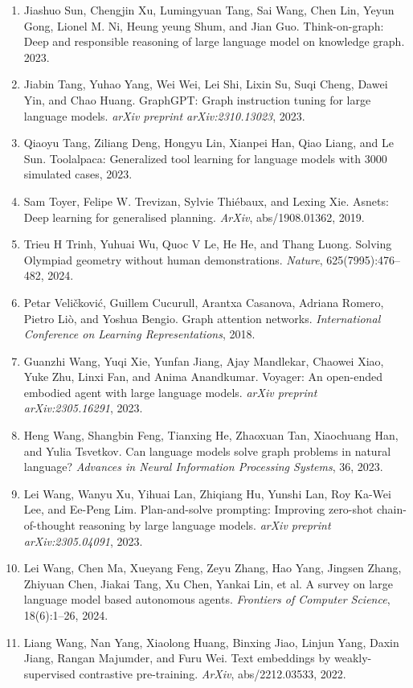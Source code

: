 \documentclass[11pt,UTF8,fontset=fandol]{ctexart}
\begin{document}
\begin{enumerate}[leftmargin=2em]
\item Jiashuo Sun, Chengjin Xu, Lumingyuan Tang, Sai Wang, Chen Lin, Yeyun Gong, Lionel M. Ni, Heung yeung Shum, and Jian Guo. Think-on-graph: Deep and responsible reasoning of large language model on knowledge graph. 2023.
\item Jiabin Tang, Yuhao Yang, Wei Wei, Lei Shi, Lixin Su, Suqi Cheng, Dawei Yin, and Chao Huang. GraphGPT: Graph instruction tuning for large language models. \textit{arXiv preprint arXiv:2310.13023}, 2023.
\item Qiaoyu Tang, Ziliang Deng, Hongyu Lin, Xianpei Han, Qiao Liang, and Le Sun. Toolalpaca: Generalized tool learning for language models with 3000 simulated cases, 2023.
\item Sam Toyer, Felipe W. Trevizan, Sylvie Thi\'ebaux, and Lexing Xie. Asnets: Deep learning for generalised planning. \textit{ArXiv}, abs/1908.01362, 2019.
\item Trieu H Trinh, Yuhuai Wu, Quoc V Le, He He, and Thang Luong. Solving Olympiad geometry without human demonstrations. \textit{Nature}, 625(7995):476--482, 2024.
\item Petar Veli\v{c}kovi\'c, Guillem Cucurull, Arantxa Casanova, Adriana Romero, Pietro Li\`o, and Yoshua Bengio. Graph attention networks. \textit{International Conference on Learning Representations}, 2018.
\item Guanzhi Wang, Yuqi Xie, Yunfan Jiang, Ajay Mandlekar, Chaowei Xiao, Yuke Zhu, Linxi Fan, and Anima Anandkumar. Voyager: An open-ended embodied agent with large language models. \textit{arXiv preprint arXiv:2305.16291}, 2023.
\item Heng Wang, Shangbin Feng, Tianxing He, Zhaoxuan Tan, Xiaochuang Han, and Yulia Tsvetkov. Can language models solve graph problems in natural language? \textit{Advances in Neural Information Processing Systems}, 36, 2023.
\item Lei Wang, Wanyu Xu, Yihuai Lan, Zhiqiang Hu, Yunshi Lan, Roy Ka-Wei Lee, and Ee-Peng Lim. Plan-and-solve prompting: Improving zero-shot chain-of-thought reasoning by large language models. \textit{arXiv preprint arXiv:2305.04091}, 2023.
\item Lei Wang, Chen Ma, Xueyang Feng, Zeyu Zhang, Hao Yang, Jingsen Zhang, Zhiyuan Chen, Jiakai Tang, Xu Chen, Yankai Lin, et al. A survey on large language model based autonomous agents. \textit{Frontiers of Computer Science}, 18(6):1--26, 2024.
\item Liang Wang, Nan Yang, Xiaolong Huang, Binxing Jiao, Linjun Yang, Daxin Jiang, Rangan Majumder, and Furu Wei. Text embeddings by weakly-supervised contrastive pre-training. \textit{ArXiv}, abs/2212.03533, 2022.

\end{enumerate}
\end{document}
